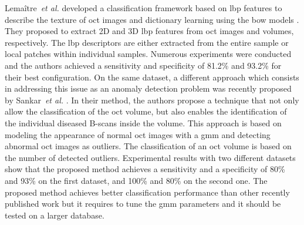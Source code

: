 Lema\^{i}tre~\textit{et al.} developed a classification framework  based on \gls{lbp} features to describe the texture of \gls{oct} images and dictionary learning using the \gls{bow} models \cite{lemaitre2015}.
They proposed to extract 2D and 3D \gls{lbp} features from \gls{oct} images and volumes, respectively.
The \gls{lbp} descriptors are either extracted from the entire sample or local patches within individual samples.
Numerous experiments were conducted and the authors achieved a sensitivity and specificity of 81.2\% and 93.2\% for their best configuration.
On the same dataset, a different approach which consists in  addressing this issue as an anomaly detection problem was recently proposed by Sankar~\textit{et al.} \cite{sankar2016}.
In their method, the authors propose a technique that not only allow the classification of the \gls{oct} volume, but also enables the identification of the individual diseased B-scans inside the volume.
This approach is based on modeling the appearance of normal \gls{oct} images with a \gls{gmm} and detecting abnormal \gls{oct} images as outliers.
The classification of an \gls{oct} volume is based on the number of detected outliers.
Experimental results with two different datasets show that the proposed method achieves a sensitivity and a specificity of 80\% and 93\% on the first dataset, and 100\% and 80\% on the second one.
The proposed method achieves better classification performance than other recently published work but it requires to tune the \gls{gmm} parameters and it should be tested on a larger database.





